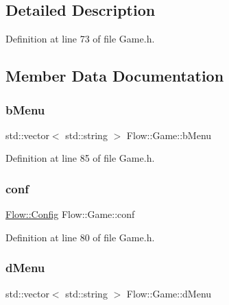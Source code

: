 \subsection{Detailed Description}


Definition at line 73 of file Game.\+h.



\subsection{Member Data Documentation}
\hypertarget{struct_flow_1_1_game_ab8ad15809dbf8afe3c2676e8cb0d2aa2}{}\label{struct_flow_1_1_game_ab8ad15809dbf8afe3c2676e8cb0d2aa2} 
\subsubsection{\texorpdfstring{b\+Menu}{bMenu}}
{\footnotesize\ttfamily std\+::vector$<$ std\+::string $>$ Flow\+::\+Game\+::b\+Menu\hspace{0.3cm}{\ttfamily [static]}}



Definition at line 85 of file Game.\+h.

\hypertarget{struct_flow_1_1_game_a1a4562b85733e7edeca321043e08a4a1}{}\label{struct_flow_1_1_game_a1a4562b85733e7edeca321043e08a4a1} 
\subsubsection{\texorpdfstring{conf}{conf}}
{\footnotesize\ttfamily \hyperlink{struct_flow_1_1_config}{Flow\+::\+Config} Flow\+::\+Game\+::conf\hspace{0.3cm}{\ttfamily [static]}}



Definition at line 80 of file Game.\+h.

\hypertarget{struct_flow_1_1_game_a2d8ee4def710e9846bf636ecfcf6a5da}{}\label{struct_flow_1_1_game_a2d8ee4def710e9846bf636ecfcf6a5da} 
\subsubsection{\texorpdfstring{d\+Menu}{dMenu}}
{\footnotesize\ttfamily std\+::vector$<$ std\+::string $>$ Flow\+::\+Game\+::d\+Menu\hspace{0.3cm}{\ttfamily [static]}}



